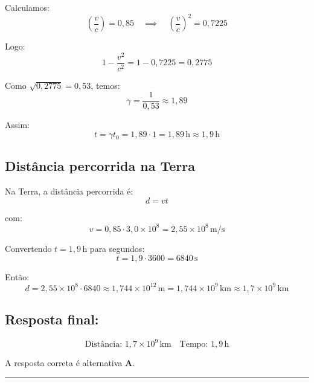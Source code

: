 \documentclass[a4paper,12pt]{article}
\begin{document}
\begin{flushleft}
Calculamos:
\[
\left( \frac{v}{c} \right) = 0{,}85 \quad \implies \quad \left( \frac{v}{c} \right)^2 = 0{,}7225
\]

Logo:
\[
1 - \frac{v^2}{c^2} = 1 - 0{,}7225 = 0{,}2775
\]

Como \(\sqrt{0{,}2775} = 0{,}53\), temos:
\[
\gamma = \frac{1}{0{,}53} \approx 1{,}89
\]

Assim:
\[
t = \gamma t_0 = 1{,}89 \cdot 1 = 1{,}89\,\mathrm{h} \approx 1{,}9\,\mathrm{h}
\]

\subsection*{Distância percorrida na Terra}

Na Terra, a distância percorrida é:
\[
d = v t
\]

com:
\[
v = 0{,}85 \cdot 3{,}0 \times 10^8 = 2{,}55 \times 10^8\, \mathrm{m/s}
\]

Convertendo \(t = 1{,}9\,\mathrm{h}\) para segundos:
\[
t = 1{,}9 \cdot 3600 = 6840\,\mathrm{s}
\]

Então:
\[
d = 2{,}55 \times 10^8 \cdot 6840 \approx 1{,}744 \times 10^{12}\,\mathrm{m} = 1{,}744 \times 10^9\,\mathrm{km} \approx 1{,}7 \times 10^9\,\mathrm{km}
\]

\subsection*{Resposta final:}

\[
\boxed{
\text{Distância: } 1{,}7 \times 10^9\,\mathrm{km} \quad \text{Tempo: } 1{,}9\,\mathrm{h}
}
\]


A resposta correta é alternativa \colorbox{green!50}{\textbf{A}}.
\end{flushleft}

\noindent\rule{\linewidth}{0.6pt}\\
\end{document}
